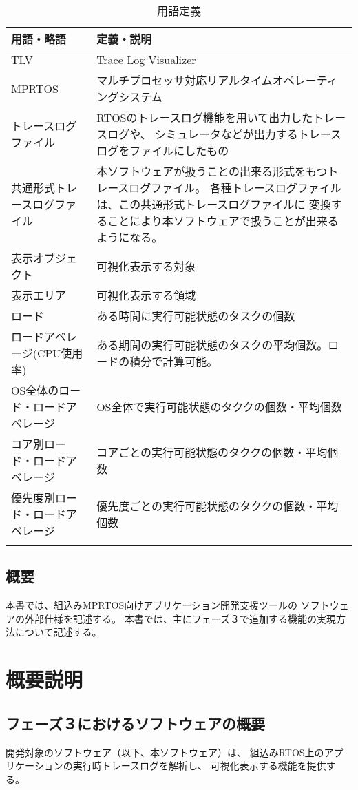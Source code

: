\documentclass[a4j]{jsarticle}
\begin{document}
\begin{table}[h]
 \centering
 \caption{用語定義}
 \begin{tabular}{|p{8em}|p{36em}|} \hline
  用語・略語& 定義・説明\\ \hline \hline
  TLV& Trace Log Visualizer\\ \hline
  MPRTOS& マルチプロセッサ対応リアルタイムオペレーティングシステム\\
  \hline
  トレースログファイル&
      RTOSのトレースログ機能を用いて出力したトレースログや、
      シミュレータなどが出力するトレースログをファイルにしたもの\\
  \hline
  共通形式トレースログファイル&
      本ソフトウェアが扱うことの出来る形式をもつトレースログファイル。
      各種トレースログファイルは、この共通形式トレースログファイルに
      変換することにより本ソフトウェアで扱うことが出来るようになる。 \\
  \hline
  表示オブジェクト&
      可視化表示する対象\\
  \hline
  表示エリア&
      可視化表示する領域\\
  \hline
  ロード &
  ある時間に実行可能状態のタスクの個数 \\
  \hline
  ロードアベレージ(CPU使用率) &
  ある期間の実行可能状態のタスクの平均個数。ロードの積分で計算可能。 \\
  \hline
  OS全体のロード・ロードアベレージ &
  OS全体で実行可能状態のタククの個数・平均個数 \\
  \hline
  コア別ロード・ロードアベレージ &
  コアごとの実行可能状態のタククの個数・平均個数 \\
  \hline
  優先度別ロード・ロードアベレージ &
  優先度ごとの実行可能状態のタククの個数・平均個数 \\
  \\
  \hline
 \end{tabular}
\end{table}

\subsection{概要}
本書では、組込みMPRTOS向けアプリケーション開発支援ツールの
ソフトウェアの外部仕様を記述する。
本書では、主にフェーズ３で追加する機能の実現方法について記述する。

\clearpage
\section{概要説明}
\subsection{フェーズ３におけるソフトウェアの概要}
開発対象のソフトウェア（以下、本ソフトウェア）は、
組込みRTOS上のアプリケーションの実行時トレースログを解析し、
可視化表示する機能を提供する。
\end{document}
